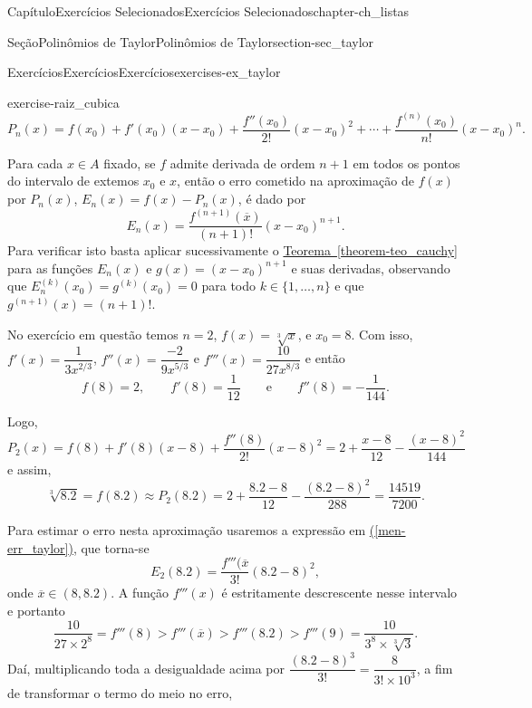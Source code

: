 \documentclass[oneside,10pt,]{book}
\newcommand{\xreffont}{\relax}
\numberwithin{equation}{section}
\begin{document}
\begin{chapterptx}{Capítulo}{Exercícios Selecionados}{}{Exercícios Selecionados}{}{}{chapter-ch_listas}
\begin{sectionptx}{Seção}{Polinômios de Taylor}{}{Polinômios de Taylor}{}{}{section-sec_taylor}
\begin{exercises-subsection-numberless}{Exercícios}{Exercícios}{}{Exercícios}{}{}{exercises-ex_taylor}
\begin{divisionexercise}{1}{}{}{exercise-raiz_cubica}
\begin{equation*}
P_n(x)=f(x_0)+f'(x_0)(x-x_0)+\dfrac{f''(x_0)}{2!}
(x-x_0)^2+\cdots+\dfrac{f^{(n)}(x_0)}{n!}(x-x_0)^n.
\end{equation*}
%
\par
Para cada \(x\in A\) fixado, se \(f\) admite derivada de ordem \(n+1\) em todos os pontos do intervalo de extemos \(x_0\) e \(x\), então o erro cometido na aproximação de \(f(x)\) por \(P_n(x)\), \(E_n(x)=f(x)-P_n(x)\), é dado por%
\begin{equation}
E_n(x)=\dfrac{f^{(n+1)}(\overline{x})}{(n+1)!}(x-x_0)^{n+1}.\label{men-err_taylor}
\end{equation}
Para verificar isto basta aplicar sucessivamente o \hyperref[theorem-teo_cauchy]{Teorema~{\xreffont\ref{theorem-teo_cauchy}}} para as funções \(E_n(x)\) e \(g(x)=(x-x_0)^{n+1}\) e suas derivadas, observando que \(E_n^{(k)}(x_0)=g^{(k)}(x_0)=0\) para todo \(k\in\{1,\ldots,n\}\) e que \(g^{(n+1)}(x)=(n+1)!\).%
\par
No exercício em questão temos \(n=2\), \(f(x)=\sqrt[3]{x}\), e \(x_0=8\). Com isso, \(f'(x)=\dfrac{1}{3x^{2/3}}\), \(f''(x)=\dfrac{-2}{9x^{5/3}}\) e \(f'''(x)=\dfrac{10}{27x^{8/3}}\) e então%
\begin{equation*}
f(8)=2,\qquad
f'(8)=\frac{1}{12}\qquad\text{e}\qquad
f''(8)=-\dfrac{1}{144}.
\end{equation*}
%
\par
Logo, \(P_2(x)=f(8)+f'(8)(x-8)+\dfrac{f''(8)}{2!}(x-8)^2=2+\dfrac{x-8}{12}
-\dfrac{(x-8)^2}{144}\) e assim,%
\begin{equation*}
\boxed{\sqrt[3]{8.2}=f(8.2)\approx
P_2(8.2)=2+\frac{8.2-8}{12}-\frac{(8.2-8)^2}{288}=\dfrac{14519}{7200}.}
\end{equation*}
%
\par
Para estimar o erro nesta aproximação usaremos a expressão em \hyperref[men-err_taylor]{({\xreffont\ref{men-err_taylor}})}, que torna-se%
\begin{equation*}
E_2(8.2)=\dfrac{f'''(\overline{x}}{3!}(8.2-8)^2,
\end{equation*}
onde \(\overline{x}\in (8,8.2)\). A função \(f'''(x)\) é estritamente descrescente nesse intervalo e portanto%
\begin{equation*}
\dfrac{10}{27\times 2^8}=f'''(8)>f'''(\overline{x})>
f'''(8.2)>f'''(9)=\dfrac{10}{3^8\times\sqrt[3]{3}}.
\end{equation*}
Daí, multiplicando toda a desigualdade acima por \(\dfrac{(8.2-8)^3}{3!}=\dfrac{8}{3!\times 10^3}\), a fim de transformar o termo do meio no erro,%

\end{divisionexercise}
\end{exercises-subsection-numberless}
\end{sectionptx}
\end{chapterptx}
\end{document}
